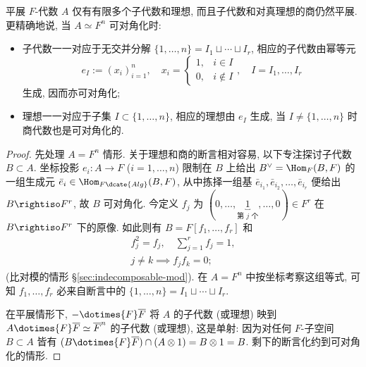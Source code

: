 \begin{lemma}\label{prop:etale-algebra-subalgebras}
	平展 $F$-代数 $A$ 仅有有限多个子代数和理想, 而且子代数和对真理想的商仍然平展. 更精确地说, 当 $A \simeq F^n$ 可对角化时:
	\begin{itemize}
		\item 子代数一一对应于无交并分解 $\{1, \ldots, n\} = I_1 \sqcup \cdots \sqcup I_r$, 相应的子代数由幂等元
			\[ e_I := (x_i)_{i=1}^n, \quad x_i = \begin{cases} 1, & i \in I \\ 0, & i \notin I \end{cases}, \quad I = I_1, \ldots, I_r \]
			生成, 因而亦可对角化;
		\item 理想一一对应于子集 $I \subset \{1, \ldots, n\}$, 相应的理想由 $e_I$ 生成, 当 $I \neq \{1, \ldots, n\}$ 时商代数也是可对角化的.
	\end{itemize}
\end{lemma}
\begin{proof}
	先处理 $A = F^n$ 情形. 关于理想和商的断言相对容易, 以下专注探讨子代数 $B \subset A$. 坐标投影 $e_i: A \to F$ ($i=1, \ldots, n$) 限制在 $B$ 上给出 $B^\vee = \Hom_F(B,F)$ 的一组生成元 $\bar{e}_i \in \Hom_{F\dcate{Alg}}(B, F)$, 从中拣择一组基 $\bar{e}_{i_1}, \bar{e}_{i_2}, \ldots, \bar{e}_{i_r}$ 便给出 $B \rightiso F^r$, 故 $B$ 可对角化. 今定义 $f_j$ 为 $(0, \ldots, \underbracket{1}_{\text{第 $j$ 个}}, \ldots, 0) \in F^r$ 在 $B \rightiso F^r$ 下的原像. 如此则有 $B = F[f_1, \ldots, f_r]$ 和
	\begin{gather*}
		f_j^2 = f_j, \quad \sum_{j=1}^r f_j = 1, \\
		j \neq k \implies f_j f_k = 0;
	\end{gather*}
	(比对模的情形 \S\ref{sec:indecomposable-mod}). 在 $A = F^n$ 中按坐标考察这组等式, 可知 $f_1, \ldots, f_r$ 必来自断言中的 $\{1, \ldots, n\} = I_1 \sqcup \cdots \sqcup I_r$.
	
	在平展情形下, $- \dotimes{F} \overline{F}$ 将 $A$ 的子代数 (或理想) 映到 $A \dotimes{F} \overline{F} \simeq \overline{F}^n$ 的子代数 (或理想), 这是单射: 因为对任何 $F$-子空间 $B \subset A$ 皆有 $(B \dotimes{F} \overline{F}) \cap (A \otimes 1) = B \otimes 1 = B$. 剩下的断言化约到可对角化的情形.
\end{proof}

